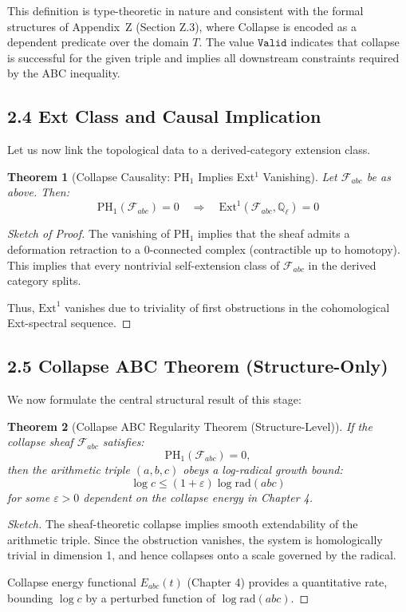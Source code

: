 \documentclass[11pt]{article}
\newtheorem{theorem}{Theorem}[section]
\begin{document}
This definition is type-theoretic in nature and consistent with the formal structures of Appendix~Z (Section Z.3), where Collapse is encoded as a dependent predicate over the domain \( T \). The value \( \texttt{Valid} \) indicates that collapse is successful for the given triple and implies all downstream constraints required by the ABC inequality.

\subsection{2.4 Ext Class and Causal Implication}

Let us now link the topological data to a derived-category extension class.

\begin{theorem}[Collapse Causality: PH$_1$ Implies Ext$^1$ Vanishing]
Let $\mathcal{F}_{abc}$ be as above. Then:
\[
\mathrm{PH}_1(\mathcal{F}_{abc}) = 0 \quad \Rightarrow \quad \mathrm{Ext}^1(\mathcal{F}_{abc}, \mathbb{Q}_\ell) = 0
\]
\end{theorem}

\begin{proof}[Sketch of Proof]
The vanishing of $\mathrm{PH}_1$ implies that the sheaf admits a deformation retraction to a 0-connected complex (contractible up to homotopy). This implies that every nontrivial self-extension class of $\mathcal{F}_{abc}$ in the derived category splits.

Thus, $\mathrm{Ext}^1$ vanishes due to triviality of first obstructions in the cohomological Ext-spectral sequence.
\end{proof}

\subsection{2.5 Collapse ABC Theorem (Structure-Only)}

We now formulate the central structural result of this stage:

\begin{theorem}[Collapse ABC Regularity Theorem (Structure-Level)]
If the collapse sheaf $\mathcal{F}_{abc}$ satisfies:
\[
\mathrm{PH}_1(\mathcal{F}_{abc}) = 0,
\]
then the arithmetic triple $(a,b,c)$ obeys a log-radical growth bound:
\[
\log c \leq (1 + \varepsilon) \log \mathrm{rad}(abc)
\]
for some $\varepsilon > 0$ dependent on the collapse energy in Chapter 4.
\end{theorem}

\begin{proof}[Sketch]
The sheaf-theoretic collapse implies smooth extendability of the arithmetic triple. Since the obstruction vanishes, the system is homologically trivial in dimension 1, and hence collapses onto a scale governed by the radical.

Collapse energy functional $E_{abc}(t)$ (Chapter 4) provides a quantitative rate, bounding $\log c$ by a perturbed function of $\log \mathrm{rad}(abc)$.
\end{proof}
\end{document}
